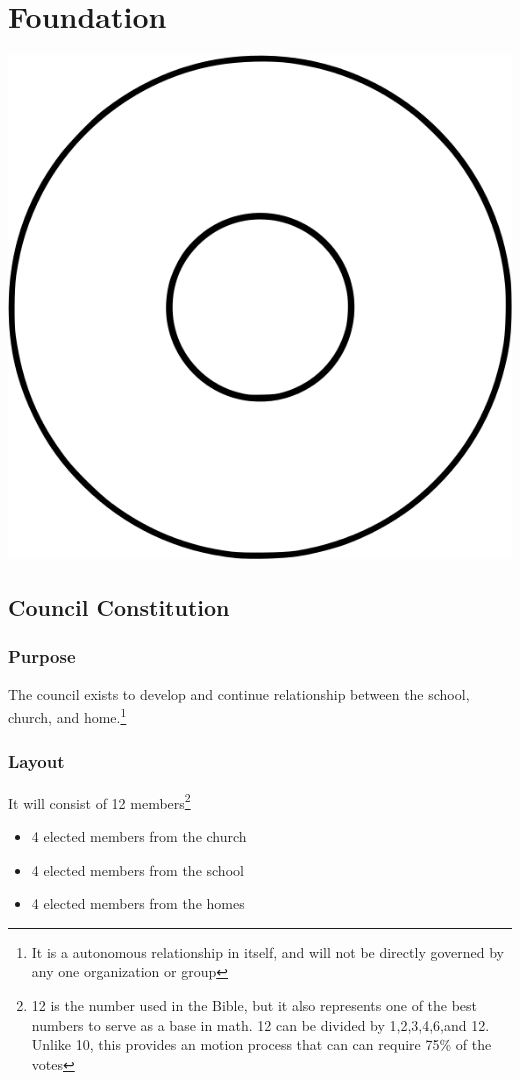 \documentclass[CSHFoundation.tex]{subfiles}
\begin{document}
\chapter{Foundation}
\centerline{\includegraphics[scale=0.35]{6-Flogo.png}}
\section{Council Constitution}
\subsection{Purpose}
The council exists to develop and continue relationship between the school, church, and home.\footnote{It is a autonomous relationship in itself, and will not be directly governed by any one organization or group}
\subsection{Layout}
It will consist of 12 members\footnote{12 is the number used in the Bible, but it also represents one of the best numbers to serve as a base in math. 12 can be divided by 1,2,3,4,6,and 12. Unlike 10, this provides an motion process that can can require 75\% of the votes}

\begin{itemize}
 \item 4 elected members from the church
 \item 4 elected members from the school
 \item 4 elected members from the homes
 \end{itemize} 
\end{document}
